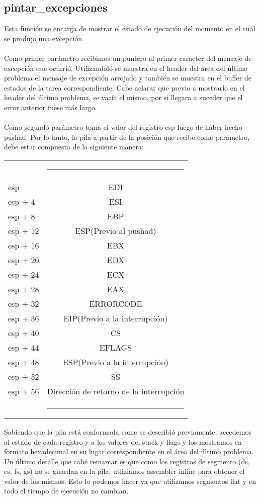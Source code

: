 \subsection{pintar\_excepciones}
Esta función se encarga de mostrar el estado de ejecución del momento en el cuál se produjo una excepción.\\
\\
Como primer parámetro recibimos un puntero al primer caracter del mensaje de excepción que ocurrió. Utilizandoló se muestra en el header del 
área del último problema el mensaje de excepción arrojado y también se muestra en el buffer de estados de la tarea correspondiente.
Cabe aclarar que previo a mostrarlo en el header del último problema, se vacía el mismo, por si llegara a suceder que el error anterior fuese más largo.\\
\\
Como segundo parámetro toma el valor del registro esp luego de haber hecho pushad.
Por lo tanto, la pila a partir de la posición que recibe como parámetro, debe estar compuesta de la siguiente manera:\\
\begin{center}
  \begin{tabular*}{200mm}{l|c|}
  & \rule[0.25cm]{80mm}{0.01cm}\\
  esp & EDI\\
  esp + 4 & ESI\\
  esp + 8 & EBP\\
  esp + 12 & ESP(Previo al pushad)\\
  esp + 16 & EBX\\
  esp + 20 & EDX\\
  esp + 24 & ECX\\
  esp + 28 & EAX\\
  esp + 32 & ERRORCODE\\
  esp + 36 & EIP(Previo a la interrupción)\\
  esp + 40 & CS\\
  esp + 44 & EFLAGS\\
  esp + 48 & ESP(Previo a la interrupción)\\
  esp + 52 & SS\\
  esp + 56 & Dirección de retorno de la interrupción\\
  & \rule[-0.2cm]{80mm}{0.01cm}\\
  \end{tabular*}
\end{center}

Sabiendo que la pila está conformada como se describió previamente, accedemos al estado de cada registro y a los valores del stack y 
flags y los mostramos en formato hexadecimal en su lugar correspondiente en el área del último problema.\\
Un último detalle que cabe remarcar es que como los registros de segmento (ds, es, fs, gs) no se guardan en la pila, utliziamos assembler-inline 
para obtener el valor de los mismos. Esto lo podemos hacer ya que utilizamos segmentos flat y en todo el tiempo de ejecución no cambian.

